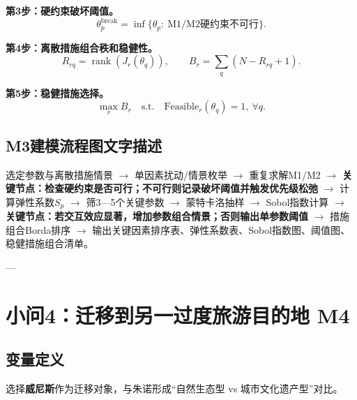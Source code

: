 \documentclass[UTF8,a4paper,12pt]{ctexart}
\begin{document}
\textbf{第3步：硬约束破坏阈值。}
\begin{equation}\tag{M3-3}
\theta_p^{\mathrm{break}}=\inf\{\theta_p:\ \text{M1/M2硬约束不可行}\}.
\end{equation}

\textbf{第4步：离散措施组合秩和稳健性。}
\begin{equation}\tag{M3-4}
R_{rq}=\operatorname{rank}\left(J_r(\theta_q)\right),\qquad B_r=\sum_q\left(N-R_{rq}+1\right).
\end{equation}

\textbf{第5步：稳健措施选择。}
\begin{equation}\tag{M3-5}
\max_r B_r\quad \text{s.t.}\quad \mathrm{Feasible}_r(\theta_q)=1,\ \forall q.
\end{equation}

\subsection{M3建模流程图文字描述}

选定参数与离散措施情景 \(\rightarrow\) 单因素扰动/情景枚举 \(\rightarrow\) 重复求解M1/M2 \(\rightarrow\) \textbf{关键节点：检查硬约束是否可行；不可行则记录破坏阈值并触发优先级松弛} \(\rightarrow\) 计算弹性系数\(S_p\) \(\rightarrow\) 筛3—5个关键参数 \(\rightarrow\) 蒙特卡洛抽样 \(\rightarrow\) Sobol指数计算 \(\rightarrow\) \textbf{关键节点：若交互效应显著，增加参数组合情景；否则输出单参数阈值} \(\rightarrow\) 措施组合Borda排序 \(\rightarrow\) 输出关键因素排序表、弹性系数表、Sobol指数图、阈值图、稳健措施组合清单。

---

\section{小问4：迁移到另一过度旅游目的地 M4}

\subsection{变量定义}

选择\textbf{威尼斯}作为迁移对象，与朱诺形成“自然生态型 vs 城市文化遗产型”对比。
\end{document}
